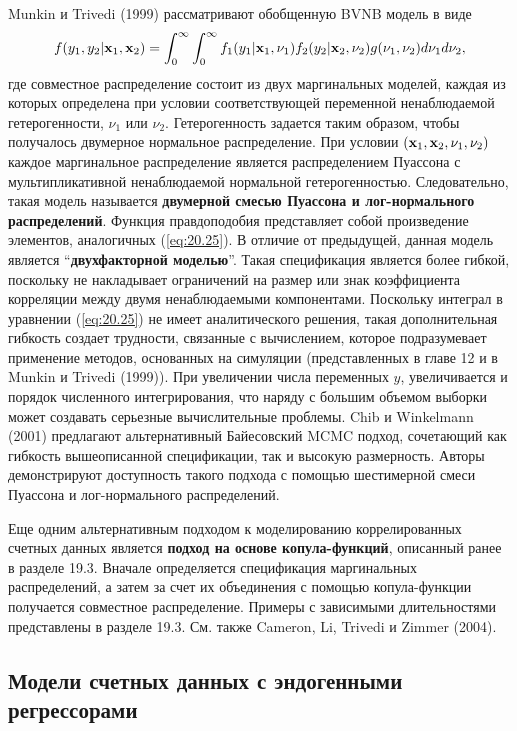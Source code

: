 Munkin и Trivedi (1999) рассматривают обобщенную BVNB модель в виде
    \begin{align}\label{eq:20.25}
    f(y_1, y_2 | \mathbf{x}_1, \mathbf{x}_2) = \int^{\infty}_{0} \int^{\infty}_{0} f_1(y_1|\mathbf{x}_1, \nu_1) f_2(y_2|\mathbf{x}_2, \nu_2) g(\nu_1, \nu_2) d\nu_1 d\nu_2,
    \end{align}
где совместное распределение состоит из двух маргинальных моделей, каждая из которых определена при условии соответствующей переменной ненаблюдаемой гетерогенности, $\nu_1$ или $\nu_2$. Гетерогенность задается таким образом, чтобы получалось двумерное нормальное распределение. При условии $(\mathbf{x}_1, \mathbf{x}_2, \nu_1, \nu_2)$ каждое маргинальное распределение является распределением Пуассона с мультипликативной ненаблюдаемой нормальной гетерогенностью. Следовательно, такая модель называется \textbf{двумерной смесью Пуассона и лог-нормального распределений}. Функция правдоподобия представляет собой произведение элементов, аналогичных (\ref{eq:20.25}). В отличие от предыдущей, данная модель является ``\textbf{двухфакторной моделью}''. Такая спецификация является более гибкой, поскольку не накладывает ограничений на размер или знак коэффициента корреляции между двумя ненаблюдаемыми компонентами. Поскольку интеграл в уравнении (\ref{eq:20.25}) не имеет аналитического решения, такая дополнительная гибкость создает трудности, связанные с вычислением, которое подразумевает применение методов, основанных на симуляции (представленных в главе 12 и в Munkin и Trivedi (1999)). %
При увеличении числа переменных $y$, увеличивается и порядок численного интегрирования, что наряду с большим объемом выборки может создавать серьезные вычислительные проблемы. Chib и Winkelmann (2001) предлагают альтернативный Байесовский MCMC подход, сочетающий как гибкость вышеописанной спецификации, так и высокую размерность. Авторы демонстрируют доступность такого подхода с помощью шестимерной смеси Пуассона и лог-нормального распределений.

Еще одним альтернативным подходом к моделированию коррелированных счетных данных является \textbf{подход на основе копула-функций}, описанный ранее в разделе 19.3. Вначале определяется спецификация маргинальных распределений, а затем за счет их объединения с помощью копула-функции получается совместное распределение. Примеры с зависимыми длительностями представлены в разделе 19.3. См. также Cameron, Li, Trivedi и Zimmer (2004).


\subsection{Модели счетных данных с эндогенными регрессорами}\label{sec:20.6.2}

